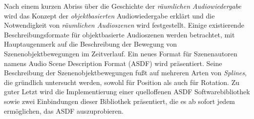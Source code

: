 Nach einem kurzen Abriss über die Geschichte
der \emph{räumlichen Audiowiedergabe}
wird das Konzept der \emph{objektbasierten} Audiowiedergabe erklärt
und die Notwendigkeit von \emph{räumlichen Audioszenen} wird festgestellt.
Einige existierende Beschreibungsformate für
objektbasierte Audioszenen werden betrachtet,
mit Hauptaugenmerk auf die Beschreibung der Bewegung von Szenenobjektbewegungen
im Zeitverlauf.
Ein neues Format für Szenenautoren namens
Audio Scene Description Format (ASDF) wird präsentiert.
Seine Beschreibung der Szenenobjektbewegungen fußt auf
mehreren Arten von \emph{Splines},
die gründlich untersucht werden,
sowohl für Position als auch für Rotation.
Zu guter Letzt wird die Implementierung
einer quelloffenen ASDF Softwarebibliothek sowie zwei Einbindungen dieser
Bibliothek präsentiert,
die es ab sofort jedem ermöglichen, das ASDF auszuprobieren.


